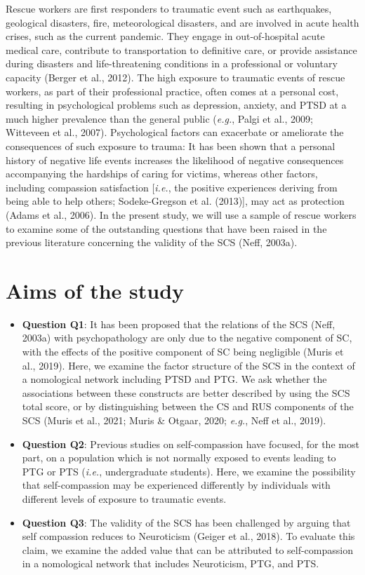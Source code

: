 \documentclass[
  english,
  man,floatsintext]{apa7}
\begin{document}
Rescue workers are first responders to traumatic event such as earthquakes, geological disasters, fire, meteorological disasters, and are involved in acute health crises, such as the current pandemic. They engage in out-of-hospital acute medical care, contribute to transportation to definitive care, or provide assistance during disasters and life-threatening conditions in a professional or voluntary capacity (Berger et al., 2012). The high exposure to traumatic events of rescue workers, as part of their professional practice, often comes at a personal cost, resulting in psychological problems such as depression, anxiety, and PTSD at a much higher prevalence than the general public (\emph{e.g.}, Palgi et al., 2009; Witteveen et al., 2007). Psychological factors can exacerbate or ameliorate the consequences of such exposure to trauma: It has been shown that a personal history of negative life events increases the likelihood of negative consequences accompanying the hardships of caring for victims, whereas other factors, including compassion satisfaction {[}\emph{i.e.}, the positive experiences deriving from being able to help others; Sodeke-Gregson et al. (2013){]}, may act as protection (Adams et al., 2006).
In the present study, we will use a sample of rescue workers to examine some of the outstanding questions that have been raised in the previous literature concerning the validity of the SCS (Neff, 2003a).

\hypertarget{aims-of-the-study}{%
\section{Aims of the study}\label{aims-of-the-study}}

\begin{itemize}
\item
  \textbf{Question Q1}: It has been proposed that the relations of the SCS (Neff, 2003a) with psychopathology are only due to the negative component of SC, with the effects of the positive component of SC being negligible (Muris et al., 2019). Here, we examine the factor structure of the SCS in the context of a nomological network including PTSD and PTG. We ask whether the associations between these constructs are better described by using the SCS total score, or by distinguishing between the CS and RUS components of the SCS (Muris et al., 2021; Muris \& Otgaar, 2020; \emph{e.g.}, Neff et al., 2019).
\item
  \textbf{Question Q2}: Previous studies on self-compassion have focused, for the most part, on a population which is not normally exposed to events leading to PTG or PTS (\emph{i.e.}, undergraduate students). Here, we examine the possibility that self-compassion may be experienced differently by individuals with different levels of exposure to traumatic events.
\item
  \textbf{Question Q3}: The validity of the SCS has been challenged by arguing that self compassion reduces to Neuroticism (Geiger et al., 2018). To evaluate this claim, we examine the added value that can be attributed to self-compassion in a nomological network that includes Neuroticism, PTG, and PTS.
\end{itemize}
\end{document}

